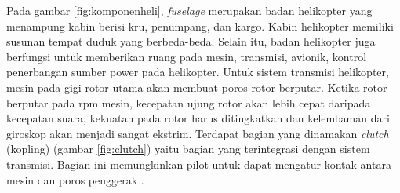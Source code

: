 Pada gambar \ref{fig:komponenheli}, \textit{fuselage} merupakan badan helikopter yang menampung kabin berisi kru, penumpang, dan kargo. Kabin helikopter memiliki susunan tempat duduk yang berbeda-beda. Selain itu, badan helikopter juga berfungsi untuk memberikan ruang pada mesin, transmisi, avionik, kontrol penerbangan sumber power pada helikopter. Untuk sistem transmisi helikopter, mesin pada gigi rotor utama akan membuat poros rotor berputar. Ketika rotor berputar pada rpm mesin, kecepatan ujung rotor akan lebih cepat daripada kecepatan suara, kekuatan pada rotor harus ditingkatkan dan kelembaman dari giroskop akan menjadi sangat ekstrim. Terdapat bagian yang dinamakan \textit{clutch} (kopling) (gambar \ref{fig:clutch}) yaitu bagian yang terintegrasi dengan sistem transmisi. Bagian ini memungkinkan pilot untuk dapat mengatur kontak antara mesin dan poros penggerak \cite{wagtendonk2006principles}.

